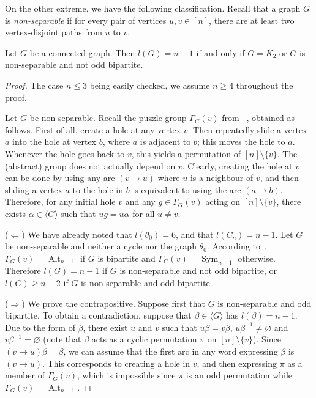 \documentclass[ALCO,ThmDefs,Unicode,epreuves]{cedram}
\DeclareMathOperator{\Sym}{Sym}
\DeclareMathOperator{\Alt}{Alt}
\newcommand{\genset}[1]{\langle#1\rangle}
\newcommand{\nset}{[n]}
\begin{document}
On the other extreme, we have the following classification. Recall that a
graph $G$ is \emph{non-separable} if for every pair of vertices $u, v \in
\nset$, there are at least two vertex-disjoint paths from $u$ to
$v$. 

\begin{proposition}\label{prop:l=n-1}
 Let $G$ be a connected graph. Then $l(G) = n-1$ if and only if
 $G = K_2$ or $G$ is non-separable and not odd bipartite. 
\end{proposition}
\begin{proof}
 The case $n \le 3$ being easily checked, we assume $n \ge 4$ throughout the
 proof.

 Let $G$ be non-separable. Recall the puzzle group $\Gamma_G(v)$ from
~\cite{Wilson1974aa}, obtained as follows. First of all, create a hole at any vertex
 $v$. Then repeatedly slide a vertex $a$ into the hole at vertex $b$, where
 $a$ is adjacent to $b$; this moves the hole to $a$. Whenever the hole goes
 back to $v$, this yields a permutation of $\nset \setminus \{v\}$. The
 (abstract) group does not actually depend on $v$. Clearly, creating the hole
 at $v$ can be done by using any arc $(v \to u)$ where $u$ is a neighbour of
 $v$, and then sliding a vertex $a$ to the hole in $b$ is equivalent to using
 the arc $(a \to b)$. Therefore, for any initial hole $v$ and any $g \in
 \Gamma_G(v)$ acting on $\nset \setminus \{v\}$, there exists
 $\alpha \in \genset{G}$ such that $u g = u \alpha$ for all $u \ne v$. 

 ($\Leftarrow$) We have already noted that $l(\theta_0)=6$, and that
 $l(C_n)=n-1$. Let $G$ be non-separable and neither a cycle nor the graph
 $\theta_0$. According to~\cite[Theorem~2]{Wilson1974aa}, $\Gamma_G(v) = \Alt_{n-1}$ if
 $G$ is bipartite and $\Gamma_G(v) = \Sym_{n-1}$ otherwise. Therefore $l(G) =
 n-1$ if $G$ is non-separable and not odd bipartite, or $l(G) \ge n-2$ if $G$
 is non-separable and odd bipartite.

 ($\Rightarrow$) We prove the contrapositive.
 Suppose first that $G$ is non-separable and odd bipartite. To obtain a
 contradiction, suppose that $\beta \in \genset{G}$ has $l(\beta) = n-1$. Due
 to the form of $\beta$, there exist $u$ and $v$ such that $u \beta = v
 \beta$, $u \beta^{-1} \ne \varnothing$ and $v\beta^{-1} = \varnothing$ (note
 that $\beta$ acts as a cyclic permutation $\pi$ on $\nset
 \setminus \{v\}$). Since $(v \to u) \beta = \beta$, we can assume that the
 first arc in any word expressing $\beta$ is $(v \to u)$. This corresponds to
 creating a hole in $v$, and then expressing $\pi$ as a member of
 $\Gamma_G(v)$, which is impossible since $\pi$ is an odd permutation while
 $\Gamma_G(v) = \Alt_{n-1}$.


\end{proof}
\end{document}
